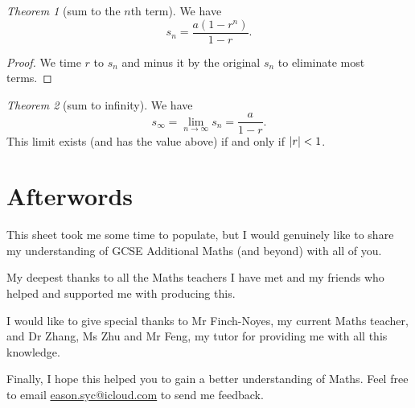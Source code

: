 \documentclass[8pt]{article}
\theoremstyle{remark}
\newtheorem{theorem}{Theorem}[section]
\begin{document}
        \begin{theorem}[sum to the $n$th term]
            We have
            $$
                s_n = \frac{a (1 - r^n)}{1 - r}.
            $$
            \begin{proof}
                We time $r$ to $s_n$ and minus it by the original $s_n$ to eliminate most terms.
            \end{proof}
        \end{theorem}

        \begin{theorem}[sum to infinity]
            We have
            $$
                s_\infty = \lim_{n \rightarrow \infty} s_n = \frac{a}{1 - r}.
            $$
            This limit exists (and has the value above) if and only if $\left\lvert r \right\rvert<1$.
        \end{theorem}

    \section*{Afterwords}

        This sheet took me some time to populate, but I would genuinely like to share my understanding of GCSE Additional Maths (and beyond) with all of you.
            
        My deepest thanks to all the Maths teachers I have met and my friends who helped and supported me with producing this.
        
        I would like to give special thanks to Mr Finch-Noyes, my current Maths teacher, and Dr Zhang, Ms Zhu and Mr Feng, my tutor for providing me with all this knowledge.

        Finally, I hope this helped you to gain a better understanding of Maths. Feel free to email \href{eason.syc@icloud.com}{eason.syc@icloud.com} to send me feedback.
\end{document}
